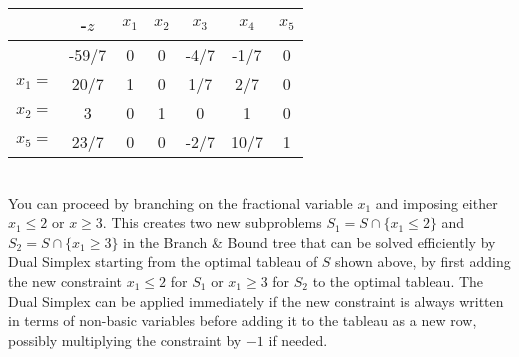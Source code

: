 \vspace{5pt}

\renewcommand{\arraystretch}{1.2}
\setlength{\tabcolsep}{8pt}

\begin{minipage}{0.72\textwidth}
\begin{tabular}{r|c|ccccc}
       & -$z$  & $x_1$ & $x_2$ & $x_3$ & $x_4$ & $x_5$\\
     \hline
       & -59/7 & 0     & 0     & -4/7  & -1/7  & 0\\
     \hline
$x_1=$ & 20/7 & 1     & 0     &  1/7  & 2/7   & 0\\
$x_2=$ &  3   & 0     & 1     &  0    &  1    & 0\\
$x_5=$ & 23/7 & 0     & 0     & -2/7  & 10/7  & 1 
\end{tabular}
\end{minipage}
\begin{minipage}{0.23\textwidth}
\footnotesize
{}
\end{minipage}\\[5pt]

You can proceed by branching on the fractional variable $x_1$ and imposing either $x_1\leq 2$ or $x\geq 3$. This creates two new subproblems $S_1 = S\cap \{x_1\leq 2\}$ and $S_2 = S\cap \{x_1\geq 3\}$ in the Branch \& Bound tree that can be solved efficiently by Dual Simplex starting from the optimal tableau of $S$ shown above, by first adding the new constraint $x_1\leq 2$ for $S_1$ or $x_1\geq 3$ for $S_2$ to the optimal tableau. The Dual Simplex can be applied immediately if the new constraint is always written in terms of non-basic variables before adding it to the tableau as a new row, possibly multiplying the constraint by $-1$ if needed. 